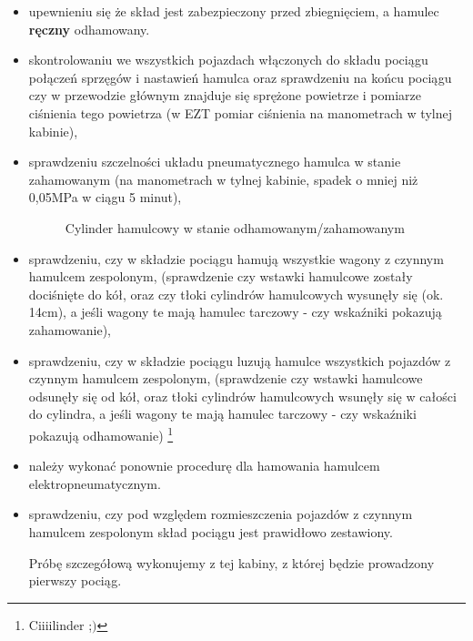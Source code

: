 \begin{itemize}
	\item upewnieniu się że skład jest zabezpieczony przed zbiegnięciem, a hamulec \textbf{ręczny} odhamowany.
	\item skontrolowaniu we wszystkich pojazdach włączonych do składu pociągu połączeń sprzęgów i nastawień hamulca oraz sprawdzeniu na końcu pociągu czy w przewodzie głównym znajduje się sprężone powietrze i pomiarze ciśnienia tego powietrza (w EZT pomiar ciśnienia na manometrach w tylnej kabinie), 
	\item sprawdzeniu szczelności układu pneumatycznego hamulca w stanie zahamowanym (na manometrach w tylnej kabinie, spadek o mniej niż 0,05MPa w ciągu 5 minut), 
	\begin{figure}
	\caption{Cylinder hamulcowy w stanie odhamowanym/zahamowanym}
\end{figure}

	\item sprawdzeniu, czy w składzie pociągu hamują wszystkie wagony z czynnym hamulcem zespolonym, (sprawdzenie czy wstawki hamulcowe zostały dociśnięte do kół, oraz czy tłoki cylindrów hamulcowych wysunęły się (ok. 14cm), a jeśli wagony te mają hamulec tarczowy - czy wskaźniki pokazują zahamowanie), 
	
	\item sprawdzeniu, czy w składzie pociągu luzują hamulce wszystkich pojazdów z czynnym hamulcem zespolonym, (sprawdzenie czy wstawki hamulcowe odsunęły się od kół, oraz tłoki cylindrów hamulcowych wsunęły się w całości do cylindra, a jeśli wagony te mają hamulec tarczowy - czy wskaźniki pokazują odhamowanie)
	\footnote{Ciiiilinder ;$)$ }
	\item należy wykonać ponownie procedurę dla hamowania hamulcem elektropneumatycznym.
	\item sprawdzeniu, czy pod względem rozmieszczenia pojazdów z czynnym hamulcem zespolonym skład pociągu jest prawidłowo zestawiony.

Próbę szczegółową wykonujemy z tej kabiny, z której będzie prowadzony pierwszy pociąg.	
\end{itemize}
